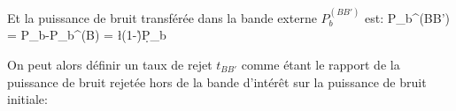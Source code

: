 Et la puissance de bruit transférée dans la bande externe $P_b^{(BB')}$ est:
\be
    P_b^{(BB')} = P_b-P_b^{(B)} = \l(1-\r)\d P_b
\ee

On peut alors définir un taux de rejet $t_{BB'}$ comme étant le rapport de la
puissance de bruit rejetée hors de la bande d'intérêt sur la puissance de
bruit initiale:
\be
\ee

\begin{comment}
\subsection{Bruits en télécommunications}

En télécommunications les signaux sont modulés et occupent une certaine bande
spectrale que l'on note $B_0$.
Dans le cas mono-canal avec un filtre de mise en forme en racine de cosinus-
surélevé, la largeur fréquentielle du signal est proportionnelle au débit de
symboles.
Or tout signal comporte du bruit provenant de sa génération.
Le bruit dans la bande spectrale intrinsèque au signal est a différencier du
bruit en dehors, pouvant provenir d'autres sources/phénomènes.

On peut alors distinguer le Rapport Signal à Bruit Propre (RSBP) au signal du
Rapport Signal à Bruit (RSB) prenant le tout.
On a alors naturellement:
\be
    RSBP>RSB.
\ee
Toute acquisition numérique implique donc un échantillonnage en respectant le
critère de Nyquist-Shannon s'accompagnant, comme mentionné précédemment, d'une
diminution du niveau de bruit dans la bande propre du signal.
Plus formellement, on note RSBP$_0$ le RSBP lorsqu'il n'y a pas de sur-échan
tillonage et RSBP quand il y en a.
\be
    RSBP_0 = P_s/(\gamma_0\d B_0) \And RSBP = P_s/(\gamma\d B_0)
\ee

On a alors:
\be
    RSBP = c_s\d RSBP_0
\ee
\end{comment}